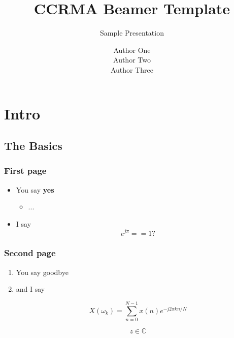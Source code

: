 \documentclass{beamer}
\title{CCRMA Beamer Template}
\subtitle{Sample Presentation}
\author{Author One \\ Author Two \\[0.7ex] Author Three}  %
\date
\institute[CCRMA]{
    CCRMA\\
    Department of Music\\
    Stanford University%
}
\begin{document}
\begin{frame}[plain]
    \titlepage
\end{frame}
\addtocounter{framenumber}{-1}  %


\begin{frame}[plain]
    \tableofcontents
\end{frame}
\addtocounter{framenumber}{-1}  %

\section[Intro]{Intro}
\begin{frame}[plain]
    \tableofcontents[currentsection]
\end{frame}
\addtocounter{framenumber}{-1}  %

\subsection[basics]{The Basics}

\begin{frame}\frametitle{First page}
    \begin{itemize}
    \item You say \textbf{yes}
        \begin{itemize}
        \item ...
        \end{itemize}
    \item I say \\
    \begin{equation*}
    e^{j \pi} == 1?
    \end{equation*}
    \end{itemize}

\end{frame}

\begin{frame}\frametitle{Second page}
    \begin{enumerate}
    \item You say goodbye
    \item and I say

    \begin{equation}
    X(\omega_k) = \sum_{n=0}^{N-1}x(n)e^{-j2\pi kn/N}
    \end{equation}

    \begin{equation}
    z \in \mathbb{C}
    \end{equation}

    \end{enumerate}
\end{frame}
\end{document}
